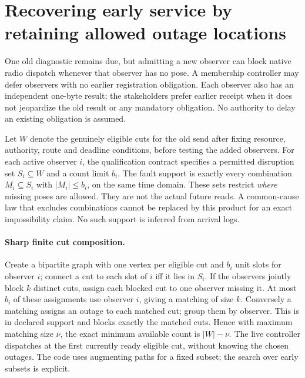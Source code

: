 \documentclass{article}
\begin{document}
\section*{Recovering early service by retaining allowed outage locations}
One old diagnostic remains due, but admitting a new observer can
block native radio dispatch whenever that observer has no pose.
A membership controller may defer observers with no earlier
registration obligation. Each observer also has an independent
one-byte result; the stakeholders prefer earlier receipt when it
does not jeopardize the old result or any mandatory obligation.
No authority to delay an existing obligation is assumed.

Let \(W\) denote the genuinely eligible cuts for the old send
after fixing resource, authority, route and deadline conditions,
before testing the added observers. For each active observer
\(i\), the qualification contract specifies a permitted
disruption set \(S_i\subseteq W\) and a count limit \(b_i\).
The fault support is exactly every combination \(M_i\subseteq S_i\)
with \(|M_i|\le b_i\), on the same time domain.
These sets restrict \emph{where} missing poses are allowed. They
are not the actual future reads. A common-cause law that excludes
combinations cannot be replaced by this product for an exact
impossibility claim. No such support is inferred from arrival logs.

\paragraph{Sharp finite cut composition.}
Create a bipartite graph with one vertex per eligible cut and
\(b_i\) unit slots for observer \(i\); connect a cut to each slot
of \(i\) iff it lies in \(S_i\). If the observers jointly block
\(k\) distinct cuts, assign each blocked cut to one observer
missing it. At most \(b_i\) of these assignments use observer
\(i\), giving a matching of size \(k\). Conversely a matching
assigns an outage to each matched cut; group them by observer.
This is in declared support and blocks exactly the matched cuts.
Hence with maximum matching size \(\nu\), the exact minimum
available count is \(|W|-\nu\). The live controller dispatches
at the first currently ready eligible cut, without knowing
the chosen outages. The code uses augmenting paths for a fixed
subset; the search over early subsets is explicit.
\end{document}
